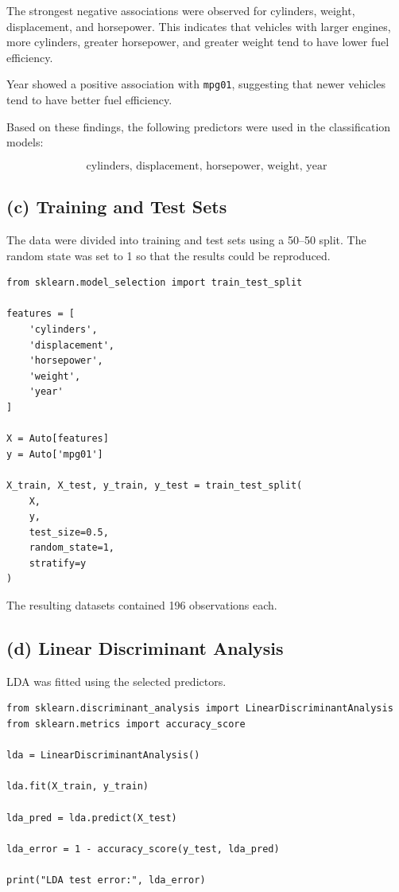 \documentclass[12pt,a4paper]{article}
\begin{document}
The strongest negative associations were observed for cylinders, weight,
displacement, and horsepower. This indicates that vehicles with larger
engines, more cylinders, greater horsepower, and greater weight tend to
have lower fuel efficiency.

Year showed a positive association with \texttt{mpg01}, suggesting that
newer vehicles tend to have better fuel efficiency.

Based on these findings, the following predictors were used in the
classification models:

\[
\boxed{
\text{cylinders, displacement, horsepower, weight, year}
}
\]

\subsection{(c) Training and Test Sets}

The data were divided into training and test sets using a 50--50 split.
The random state was set to 1 so that the results could be reproduced.

\begin{lstlisting}
from sklearn.model_selection import train_test_split

features = [
    'cylinders',
    'displacement',
    'horsepower',
    'weight',
    'year'
]

X = Auto[features]
y = Auto['mpg01']

X_train, X_test, y_train, y_test = train_test_split(
    X,
    y,
    test_size=0.5,
    random_state=1,
    stratify=y
)
\end{lstlisting}

The resulting datasets contained 196 observations each.

\subsection{(d) Linear Discriminant Analysis}

LDA was fitted using the selected predictors.

\begin{lstlisting}
from sklearn.discriminant_analysis import LinearDiscriminantAnalysis
from sklearn.metrics import accuracy_score

lda = LinearDiscriminantAnalysis()

lda.fit(X_train, y_train)

lda_pred = lda.predict(X_test)

lda_error = 1 - accuracy_score(y_test, lda_pred)

print("LDA test error:", lda_error)
\end{lstlisting}
\end{document}
